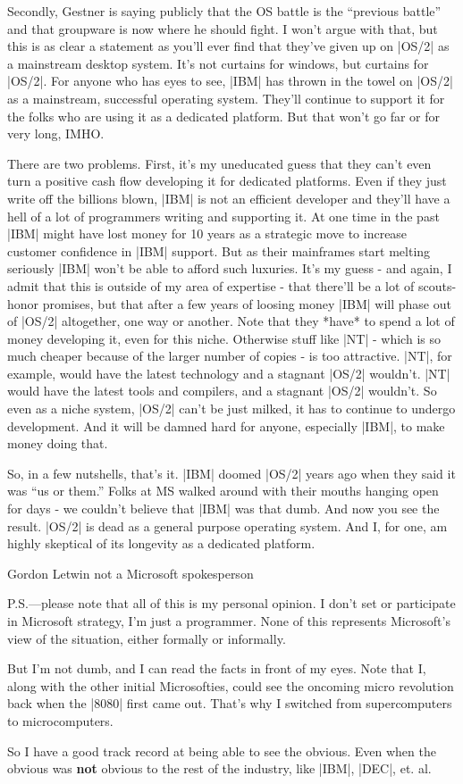 Secondly, Gestner is saying publicly that the OS battle is the ``previous
battle'' and that groupware is now where he should fight.  I won't argue
with that, but this is as clear a statement as you'll ever find that they've
given up on |OS/2| as a mainstream desktop system.  It's not curtains for
windows, but curtains for |OS/2|.   For anyone who has eyes to see, |IBM|
has thrown in the towel on |OS/2| as a mainstream, successful operating system.
They'll continue to support it for the folks who are using it as a
dedicated platform.  But that won't go far or for very long, IMHO.

There are two problems.  First, it's my uneducated guess that they can't
even turn a positive cash flow developing it for dedicated platforms.
Even if they just write off the billions blown, |IBM| is not an efficient
developer and they'll have a hell of a lot of programmers writing and
supporting it.  At one time in the past |IBM| might have lost money for
10 years as a strategic move to increase customer confidence in |IBM|
support.  But as their mainframes start melting seriously |IBM| won't be
able to afford such luxuries.  It's my guess - and again, I admit that
this is outside of my area of expertise - that there'll be a lot of
scouts-honor promises, but that after a few years of loosing money
|IBM| will phase out of |OS/2| altogether, one way or another.  Note that they
*have* to spend a lot of money developing it, even for this niche. Otherwise
stuff like |NT| - which is so much cheaper because of the larger number
of copies - is too attractive.  |NT|, for example, would have the latest
technology and a stagnant |OS/2| wouldn't.  |NT| would have the latest tools
and compilers, and a stagnant |OS/2| wouldn't.  So even as a niche system,
|OS/2| can't be just milked, it has to continue to undergo development.
And it will be damned hard for anyone, especially |IBM|, to make money
doing that.

So, in a few nutshells, that's it.  |IBM| doomed |OS/2| years ago when
they said it was ``us or them.''  Folks at MS walked around with their
mouths hanging open for days - we couldn't believe that |IBM| was that
dumb.  And now you see the result.  |OS/2| is dead as a general purpose
operating system.  And I, for one, am highly skeptical of its longevity
as a dedicated platform.

{\parindent=3in\parskip=2pt \obeylines Gordon Letwin
not a Microsoft spokesperson
}

\noindent P.S.---please note that all of this is my personal opinion.  I don't
set or participate in Microsoft strategy, I'm just a programmer.  
None of this represents Microsoft's view of the situation, either
formally or informally.

But I'm not dumb, and I can read the facts in front of my eyes.  Note that
I, along with the other initial Microsofties, could see the oncoming
micro revolution back when the |8080| first came out.  That's why I
switched from supercomputers to microcomputers.  

So I have a good track record at being able to see the obvious.  Even
when the obvious was {\bf not} obvious to the rest of the industry, like
|IBM|, |DEC|, et. al.
\bye
